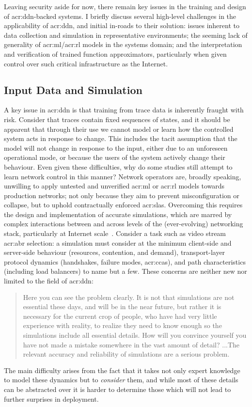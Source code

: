 Leaving security aside for now, there remain key issues in the training and design of \gls{acr:ddn}-backed systems.
I briefly discuss several high-level challenges in the applicability of \gls{acr:ddn}, and initial in-roads to their solution: issues inherent to data collection and simulation in representative environments; the seeming lack of generality of \gls{acr:ml}/\gls{acr:rl} models in the systems domain; and the interpretation and verification of trained function approximators, particularly when given control over such critical infrastructure as the Internet.

\subsection{Input Data and Simulation}
A key issue in \gls{acr:ddn} is that training from trace data is inherently fraught with risk.
Consider that traces contain fixed sequences of states, and it should be apparent that through their use we cannot model or learn how the controlled system acts in response to change.
This includes the tacit assumption that the model will not change in response to the input, either due to an unforeseen operational mode, or because the users of the system actively change their behaviour.
Even given these difficulties, why do some studies still attempt to learn network control in this manner?
Network operators are, broadly speaking, unwilling to apply untested and unverified \gls{acr:ml} or \gls{acr:rl} models towards production networks; not only because they aim to prevent misconfiguration or collapse, but to uphold contractually enforced \glspl{acr:sla}.
Overcoming this requires the design and implementation of accurate simulations, which are marred by complex interactions between and across levels of the (ever-evolving) networking stack, particularly at Internet scale~\parencite{DBLP:journals/ton/X01c}.
Consider a task such as video stream \gls{acr:abr} selection: a simulation must consider at the minimum client-side and server-side behaviour (resources, contention, and demand), transport-layer protocol dynamics (handshakes, failure modes, \glspl{acr:cca}), and path characteristics (including load balancers) to name but a few.
These concerns are neither new nor limited to the field of \gls{acr:ddn}:
\begin{quotation}
\noindent
Here you can see the problem clearly.
It is not that simulations are not essential these days, and will be in the near future, but rather it is necessary for the current crop of people, who have had very little experience with reality, to realize they need to know enough so the simulations include all essential details.
How will you convince yourself you have not made a mistake somewhere in the vast amount of detail?
...The relevant accuracy and reliability of simulations are a serious problem.\\
\strut\hfill\parencite[p. 248]{hamming-art-of-scieng} 
\end{quotation}
The main difficulty arises from the fact that it takes not only expert knowledge to model these dynamics but to \emph{consider} them, and while most of these details can be abstracted over it is harder to determine those which will not lead to further surprises in deployment.

